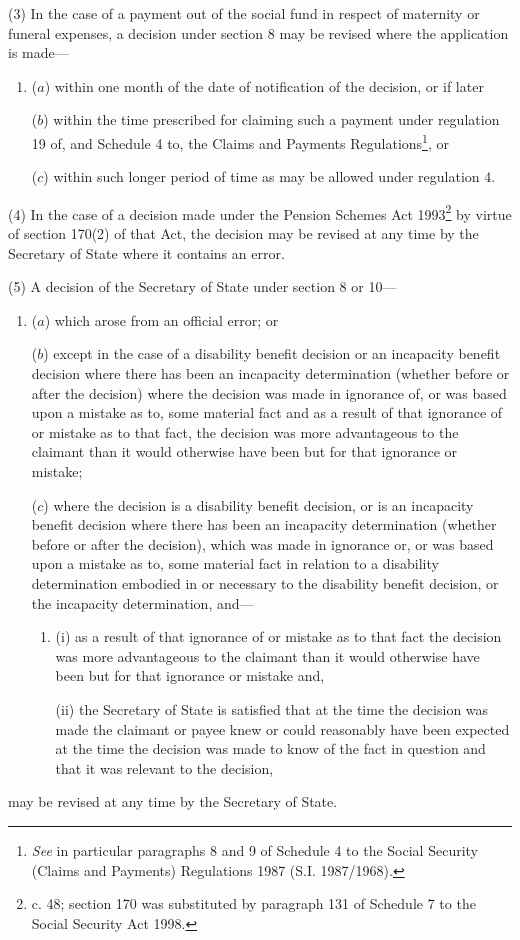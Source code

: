 \documentclass[12pt,a4paper]{article}
\begin{document}
(3) In the case of a payment out of the social fund in respect of maternity or funeral expenses, a decision under section 8 may be revised where the application is made—
\begin{enumerate}\item[]
($a$) within one month of the date of notification of the decision, or if later

($b$) within the time prescribed for claiming such a payment under regulation 19 of, and Schedule 4 to, the Claims and Payments Regulations\footnote{\frenchspacing \emph{See} in particular paragraphs 8 and 9 of Schedule 4 to the Social Security (Claims and Payments) Regulations 1987 (S.I. 1987/1968).}, or

($c$) within such longer period of time as may be allowed under regulation 4.
\end{enumerate}

(4) In the case of a decision made under the Pension Schemes Act 1993\footnote{ c. 48; section 170 was substituted by paragraph 131 of Schedule 7 to the Social Security Act 1998.} by virtue of section 170(2) of that Act, the decision may be revised at any time by the Secretary of State where it contains an error.

(5) A decision of the Secretary of State under section 8 or 10—
\begin{enumerate}\item[]
($a$) which arose from an official error; or

($b$) 
except in the case of a disability benefit decision or an incapacity benefit decision where there has been an incapacity determination (whether before or after the decision)  %
where the decision was made in ignorance of, or was based upon a mistake as to, some material fact and as a result of that ignorance of or mistake as to that fact, the decision was more advantageous to the claimant than it would otherwise have been but for that ignorance or mistake;

($c$) where the decision is a disability benefit decision, or is an incapacity benefit decision where there has been an incapacity determination (whether before or after the decision), which was made in ignorance or, or was based upon a mistake as to, some material fact in relation to a disability determination embodied in or necessary to the disability benefit decision, or the incapacity determination, and---
\begin{enumerate}\item[]
(i) as a result of that ignorance of or mistake as to that fact the decision was more advantageous to the claimant than it would otherwise have been but for that ignorance or mistake and,

(ii) the Secretary of State is satisfied that at the time the decision was made the claimant or payee knew or could reasonably have been expected at the time the decision was made to know of the fact in question and that it was relevant to the decision,
\end{enumerate}
\end{enumerate}
may be revised at any time by the Secretary of State.
\end{document}
